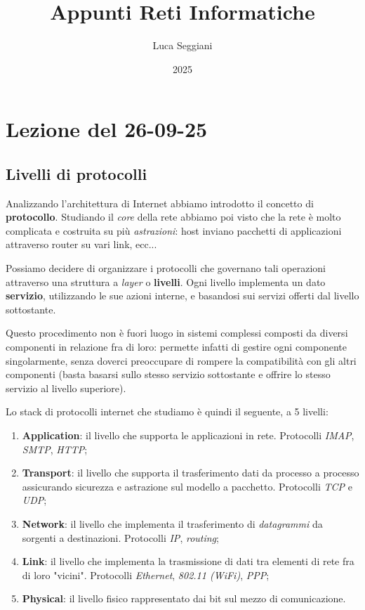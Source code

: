 \documentclass[a4paper,11pt]{article}
\title{Appunti Reti Informatiche}
\author{Luca Seggiani}
\date{2025}
\begin{document}
\section{Lezione del 26-09-25}

\thispagestyle{empty}
\pagestyle{fancy}

\subsection{Livelli di protocolli}
Analizzando l'architettura di Internet abbiamo introdotto il concetto di \textbf{protocollo}. 
Studiando il \textit{core} della rete abbiamo poi visto che la rete è molto complicata e costruita su più \textit{astrazioni}: host inviano pacchetti di applicazioni attraverso router su vari link, ecc...

Possiamo decidere di organizzare i protocolli che governano tali operazioni attraverso una struttura a \textit{layer} o \textbf{livelli}.
Ogni livello implementa un dato \textbf{servizio}, utilizzando le sue azioni interne, e basandosi sui servizi offerti dal livello sottostante.

Questo procedimento non è fuori luogo in sistemi complessi composti da diversi componenti in relazione fra di loro: permette infatti di gestire ogni componente singolarmente, senza doverci preoccupare di rompere la compatibilità con gli altri componenti (basta basarsi sullo stesso servizio sottostante e offrire lo stesso servizio al livello superiore).

Lo stack di protocolli internet che studiamo è quindi il seguente, a 5 livelli:
\begin{enumerate}
	\item \textbf{Application}: il livello che supporta le applicazioni in rete. Protocolli \textit{IMAP}, \textit{SMTP}, \textit{HTTP}; 
	\item \textbf{Transport}: il livello che supporta il trasferimento dati da processo a processo assicurando sicurezza e astrazione sul modello a pacchetto. Protocolli \textit{TCP} e \textit{UDP};
	\item \textbf{Network}: il livello che implementa il trasferimento di \textit{datagrammi} da sorgenti a destinazioni. Protocolli \textit{IP}, \textit{routing};
	\item \textbf{Link}: il livello che implementa la trasmissione di dati tra elementi di rete fra di loro "vicini". Protocolli \textit{Ethernet}, \textit{802.11 (WiFi)}, \textit{PPP};
	\item \textbf{Physical}: il livello fisico rappresentato dai bit sul mezzo di comunicazione.
\end{enumerate}
\end{document}
